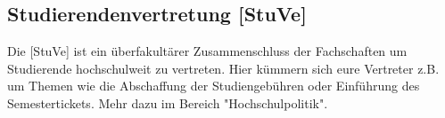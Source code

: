 \subsection{Studierendenvertretung [StuVe]}
Die [StuVe] ist ein überfakultärer Zusammenschluss der Fachschaften 
um Studierende hochschulweit zu vertreten. Hier kümmern sich 
eure Vertreter z.B. um Themen wie die Abschaffung der Studiengebühren 
oder Einführung des Semestertickets. Mehr dazu im Bereich 
"Hochschulpolitik". 